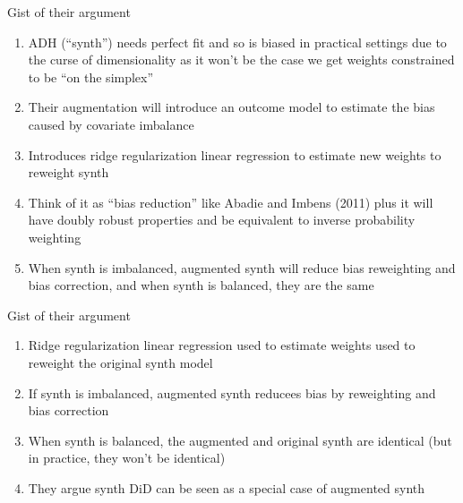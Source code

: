 \documentclass{beamer}
\begin{document}
\begin{frame}{Gist of their argument}

\begin{enumerate}
\item ADH (``synth'') needs perfect fit and so is biased in practical settings due to the curse of dimensionality as it won't be the case we get weights constrained to be ``on the simplex''
\item Their augmentation will introduce an outcome model to estimate the bias caused by covariate imbalance 
\item Introduces ridge regularization linear regression to estimate new weights to reweight synth
\item Think of it as ``bias reduction'' like Abadie and Imbens (2011) plus it will have doubly robust properties and be equivalent to inverse probability weighting
\item When synth is imbalanced, augmented synth will reduce bias reweighting and bias correction, and when synth is balanced, they are the same
\end{enumerate}

\end{frame}


\begin{frame}{Gist of their argument}

\begin{enumerate}
\item Ridge regularization linear regression used to estimate weights used to reweight the original synth model
\item If synth is imbalanced, augmented synth reducees bias by reweighting and bias correction
\item When synth is balanced, the augmented and original synth are identical (but in practice, they won't be identical)
\item They argue synth DiD can be seen as a special case of augmented synth
\end{enumerate}

\end{frame}
\end{document}
